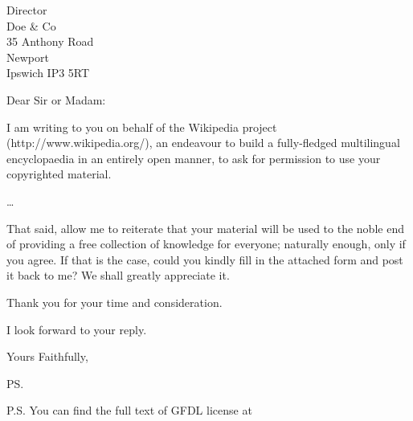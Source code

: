 \documentclass{letter}
\begin{document}
\begin{letter}{Director \\ Doe \& Co \\ 35
 Anthony Road
\\ Newport \\ Ipswich IP3 5RT}
\opening{Dear Sir or Madam:}

I am writing to you on behalf of the Wikipedia 
project (http://www.wikipedia.org/),
an endeavour to build a fully-fledged multilingual
 encyclopaedia in an entirely
open manner, to ask for permission to use your 
copyrighted material.

\ldots 

That said, allow me to reiterate that your material will be used to the noble end of
providing a free collection of knowledge for everyone; naturally enough, only if you
agree. If that is the case, could you kindly fill in the attached form and post it
back to me? We shall greatly appreciate it.

Thank you for your time and consideration.

I look forward to your reply.

\closing{Yours Faithfully,}

\ps

P.S. You can find the full text of GFDL license at



\end{letter}
\end{document}
